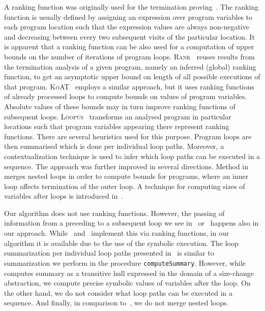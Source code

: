 \documentclass[10pt,a4paper]{article}
\newcommand{\Loopus}{\textsc{Loopus}\xspace}
\newcommand{\KoAT}{\textsc{KoAT}\xspace}
\newcommand{\Rank}{\textsc{Rank}\xspace}
\begin{document}
A ranking function was originally used for the termination
proving~\cite{Terminator2006,T2,ARMC,FGPSF,KITTEL}. The ranking function is
usually defined by assigning an expression over program variables to each
program location such that the expression values are always non-negative and
decreasing between every two subsequent visits of the particular
location. It is apparent that a ranking function can be also used for a
computation of upper bounds on the number of iterations of program
loops. \Rank~\cite{Rank2010} reuses results from the termination analysis of
a given program, namely an inferred (global) ranking function, to get an
asymptotic upper bound on length of all possible executions of that
program. \KoAT~\cite{KoAT2014} employs a similar approach, but it uses ranking
functions of already processed loops to compute bounds on values of program
variables. Absolute values of these bounds may in turn improve ranking
functions of subsequent loops. \Loopus~\cite{Loopus2011} transforms an
analysed program in particular locations such that program variables
appearing there represent ranking functions. There are several heuristics
used for this purpose.  Program loops are then summarised which is done per
individual loop paths.  Moreover, a contextualization technique is used to
infer which loop paths can be executed in a sequence.  The approach was
further improved in several directions. Method in~\cite{Loopus2014} merges
nested loops in order to compute bounds for programs, where an inner loop
affects termination of the outer loop. A technique for computing sizes of
variables after loops is introduced in~\cite{Loopus2015}.

Our algorithm does not use ranking functions. However, the passing of
information from a preceding to a subsequent loop we see in~\cite{KoAT2014}
or~\cite{Loopus2015} happens also in our approach. While~\cite{KoAT2014}
and~\cite{Loopus2015} implement this via ranking functions, in our algorithm
it is available due to the use of the symbolic execution. The loop
summarization per individual loop paths presented in~\cite{Loopus2011} is
similar to summarization we perform in the procedure
\texttt{computeSummary}. However, while \cite{Loopus2011} computes summary
as a transitive hull expressed in the domain of a size-change abstraction,
we compute precise symbolic values of variables after the loop. On the other
hand, we do not consider what loop paths can be executed in a sequence. And
finally, in comparison to~\cite{Loopus2014}, we do not merge nested loops.
\end{document}
